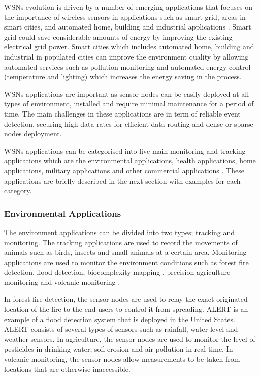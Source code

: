 WSNs evolution is driven by a number of emerging applications that focuses on the importance of wireless sensors in applications such as smart grid, areas in smart cities, and automated home, building and industrial applications \cite{beyondInteroperability}. Smart grid could save considerable amounts of energy by improving the existing electrical grid power. Smart cities which includes automated home, building and industrial in populated cities can improve the environment quality by allowing automated services such as pollution monitoring and automated energy control (temperature and lighting) which increases the energy saving in the process. 

WSNs applications are important as sensor nodes can be easily deployed at all types of environment, installed and require minimal maintenance for a period of time. The main challenges in these applications are in term of reliable event detection, securing high data rates for efficient data routing and dense or sparse nodes deployment.

WSNs applications can be categorised into five main monitoring and tracking applications which are the environmental applications, health applications, home applications, military applications and other commercial applications \cite{wsnSurvey2}. These applications are briefly described in the next section with examples for each category. 

\subsubsection{Environmental Applications}
The environment applications can be divided into two types; tracking and monitoring. The tracking applications are used to record the movements of animals such as birds, insects and small animals at a certain area. Monitoring applications are used to monitor the environment conditions such as forest fire detection, flood detection, biocomplexity mapping \cite{Cerpahabitatmonitoring}, precision agriculture monitoring and volcanic monitoring \cite{volcano}.

In forest fire detection, the sensor nodes are used to relay the exact originated location of the fire to the end users to control it from spreading. ALERT is an example of a flood detection system that is deployed in the United States. ALERT consists of several types of sensors such as rainfall, water level and weather sensors. In agriculture, the sensor nodes are used to monitor the level of pesticides in drinking water, soil erosion and air pollution in real time. In volcanic monitoring, the sensor nodes allow measurements to be taken from locations that are otherwise inaccessible. 

